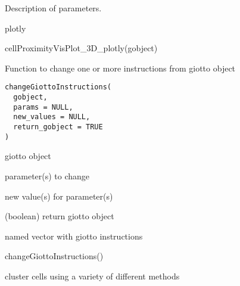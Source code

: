 \documentclass[a4paper]{book}
\begin{document}
%
\begin{Details}\relax
Description of parameters.
\end{Details}
%
\begin{Value}
plotly
\end{Value}
%
\begin{Examples}
\begin{ExampleCode}
    cellProximityVisPlot_3D_plotly(gobject)
\end{ExampleCode}
\end{Examples}
%
\begin{Description}\relax
Function to change one or more instructions from giotto object
\end{Description}
%
\begin{Usage}
\begin{verbatim}
changeGiottoInstructions(
  gobject,
  params = NULL,
  new_values = NULL,
  return_gobject = TRUE
)
\end{verbatim}
\end{Usage}
%
\begin{Arguments}
\begin{ldescription}
\item[\code{gobject}] giotto object

\item[\code{params}] parameter(s) to change

\item[\code{new\_values}] new value(s) for parameter(s)

\item[\code{return\_gobject}] (boolean) return giotto object
\end{ldescription}
\end{Arguments}
%
\begin{Value}
named vector with giotto instructions
\end{Value}
%
\begin{Examples}
\begin{ExampleCode}
    changeGiottoInstructions()
\end{ExampleCode}
\end{Examples}
%
\begin{Description}\relax
cluster cells using a variety of different methods
\end{Description}
%
\end{document}
